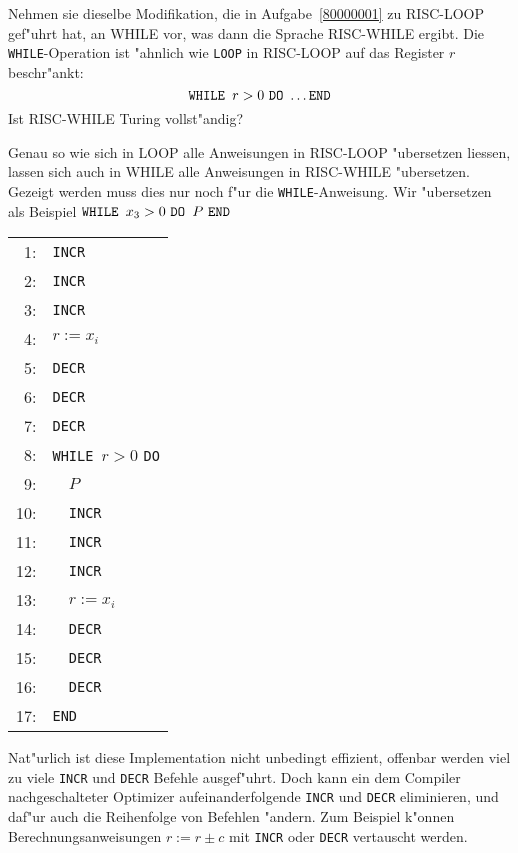 Nehmen sie dieselbe Modifikation, die in Aufgabe~\ref{80000001}
zu RISC-LOOP gef"uhrt hat,
an WHILE vor, was dann die Sprache RISC-WHILE ergibt. Die {\tt WHILE}-Operation
ist "ahnlich wie {\tt LOOP} in RISC-LOOP auf das Register $r$ beschr"ankt:
\[
\text{\tt WHILE }r>0\text{ \tt DO} \dots { \tt END}
\]
Ist RISC-WHILE Turing vollst"andig?

\begin{loesung}
Genau so wie sich in LOOP alle Anweisungen in RISC-LOOP "ubersetzen
liessen, lassen sich auch in WHILE alle Anweisungen in RISC-WHILE
"ubersetzen. Gezeigt werden muss dies nur noch f"ur die {\tt WHILE}-Anweisung.
Wir "ubersetzen als Beispiel $\text{\tt WHILE }x_3 > 0\text{ \tt DO }P \text{ \tt END}$
\begin{center}
\begin{tabular}{r<{:}l}
 1& {\tt INCR}\\
 2& {\tt INCR}\\
 3& {\tt INCR}\\
 4& $r:=x_i$\\
 5& {\tt DECR}\\
 6& {\tt DECR}\\
 7& {\tt DECR}\\
 8& {\tt WHILE }$r > 0$ { \tt DO}\\
 9& {\tt \ \ }$P$\\
10& {\tt \ \ INCR}\\
11& {\tt \ \ INCR}\\
12& {\tt \ \ INCR}\\
13& {\tt \ \ }$r:=x_i$\\
14& {\tt \ \ DECR}\\
15& {\tt \ \ DECR}\\
16& {\tt \ \ DECR}\\
17& {\tt END}
\end{tabular}
\end{center}
Nat"urlich ist diese Implementation nicht unbedingt effizient, offenbar werden
viel zu viele {\tt INCR} und {\tt DECR} Befehle ausgef"uhrt. Doch kann ein
dem Compiler nachgeschalteter Optimizer aufeinanderfolgende {\tt INCR} und
{\tt DECR} eliminieren, und daf"ur auch die Reihenfolge von Befehlen "andern.
Zum Beispiel k"onnen Berechnungsanweisungen $r:= r\pm c$ mit {\tt INCR}
oder {\tt DECR} vertauscht werden.
\end{loesung}
